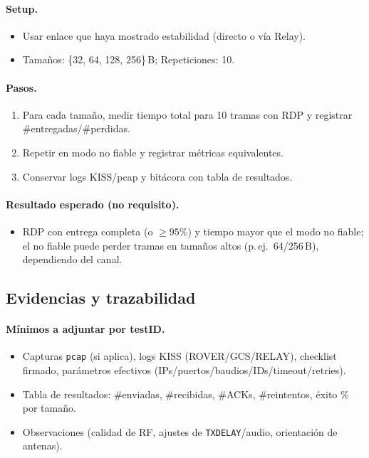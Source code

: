 \paragraph{Setup.}
\begin{itemize}
  \item Usar enlace que haya mostrado estabilidad (directo o vía Relay).
  \item Tamaños: \{32, 64, 128, 256\}\,B; Repeticiones: 10.
\end{itemize}

\paragraph{Pasos.}
\begin{enumerate}
  \item Para cada tamaño, medir tiempo total para 10 tramas con RDP y registrar \#entregadas/\#perdidas.
  \item Repetir en modo no fiable y registrar métricas equivalentes.
  \item Conservar logs KISS/pcap y bitácora con tabla de resultados.
\end{enumerate}

\paragraph{Resultado esperado (no requisito).}
\begin{itemize}
  \item RDP con entrega completa (o $\ge 95\%$) y tiempo mayor que el modo no fiable; el no fiable puede perder tramas
        en tamaños altos (p.\,ej.\ 64/256\,B), dependiendo del canal.
\end{itemize}

\subsection*{Evidencias y trazabilidad}
\paragraph{Mínimos a adjuntar por testID.}
\begin{itemize}
  \item Capturas \texttt{pcap} (si aplica), logs KISS (ROVER/GCS/RELAY), checklist firmado, parámetros efectivos (IPs/puertos/baudios/IDs/timeout/retries).
  \item Tabla de resultados: \#enviadas, \#recibidas, \#ACKs, \#reintentos, éxito \% por tamaño.
  \item Observaciones (calidad de RF, ajustes de \texttt{TXDELAY}/audio, orientación de antenas).
\end{itemize}

